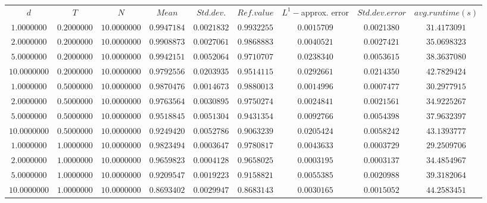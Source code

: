 \begin{tabular}{ccccccccc}
$d$ & $T$ & $N$ & $Mean$ & $Std. dev.$ & $Ref. value$ & $L^1-$approx. error & $Std. dev. error$ & $avg. runtime (s)$\\
$1.0000000$ & $0.2000000$ & $10.0000000$ & $0.9947184$ & $0.0021832$ & $0.9932255$ & $0.0015709$ & $0.0021380$ & $31.4173091$\\
$2.0000000$ & $0.2000000$ & $10.0000000$ & $0.9908873$ & $0.0027061$ & $0.9868883$ & $0.0040521$ & $0.0027421$ & $35.0698323$\\
$5.0000000$ & $0.2000000$ & $10.0000000$ & $0.9942151$ & $0.0052064$ & $0.9710707$ & $0.0238340$ & $0.0053615$ & $38.3637080$\\
$10.0000000$ & $0.2000000$ & $10.0000000$ & $0.9792556$ & $0.0203935$ & $0.9514115$ & $0.0292661$ & $0.0214350$ & $42.7829424$\\
$1.0000000$ & $0.5000000$ & $10.0000000$ & $0.9870476$ & $0.0014673$ & $0.9880013$ & $0.0014996$ & $0.0007477$ & $30.2977915$\\
$2.0000000$ & $0.5000000$ & $10.0000000$ & $0.9763564$ & $0.0030895$ & $0.9750274$ & $0.0024841$ & $0.0021561$ & $34.9225267$\\
$5.0000000$ & $0.5000000$ & $10.0000000$ & $0.9518845$ & $0.0051304$ & $0.9431354$ & $0.0092766$ & $0.0054398$ & $37.9632397$\\
$10.0000000$ & $0.5000000$ & $10.0000000$ & $0.9249420$ & $0.0052786$ & $0.9063239$ & $0.0205424$ & $0.0058242$ & $43.1393777$\\
$1.0000000$ & $1.0000000$ & $10.0000000$ & $0.9823494$ & $0.0003647$ & $0.9780817$ & $0.0043633$ & $0.0003729$ & $29.2509706$\\
$2.0000000$ & $1.0000000$ & $10.0000000$ & $0.9659823$ & $0.0004128$ & $0.9658025$ & $0.0003195$ & $0.0003137$ & $34.4854967$\\
$5.0000000$ & $1.0000000$ & $10.0000000$ & $0.9209547$ & $0.0019223$ & $0.9158821$ & $0.0055385$ & $0.0020988$ & $39.3182064$\\
$10.0000000$ & $1.0000000$ & $10.0000000$ & $0.8693402$ & $0.0029947$ & $0.8683143$ & $0.0030165$ & $0.0015052$ & $44.2583451$\\
\end{tabular}
